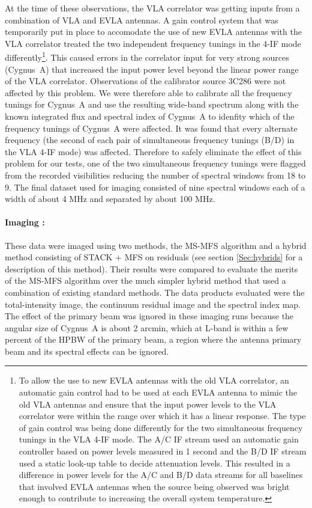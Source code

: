 \documentclass[structabstract]{stylefiles/aa}
\begin{document}
At the time of these observations, the VLA correlator was getting inputs from
a combination of VLA and EVLA antennas. A gain control system that was temporarily
put in place to accomodate the use of new EVLA antennas with the VLA correlator
treated the two independent frequency tunings
in the 4-IF mode differently\footnote
{
To allow the use to new EVLA antennas with
the old VLA correlator, an automatic gain control had to be used at each EVLA antenna
to mimic the old VLA antennas and ensure that the input power levels to the VLA correlator 
were within the range over which it has a linear response. The type of gain control 
was being done differently for the two simultaneous
frequency tunings in the VLA 4-IF mode. The A/C IF stream used an automatic
gain controller based on power levels measured in 1 second and the B/D IF stream
used a static look-up table to decide attenuation levels.
This resulted in a difference in power levels
for the A/C and B/D data streams for all baselines that involved EVLA antennas
when the source being observed was bright enough to contribute to increasing the
overall system temperature.
}. This caused errors in the correlator input for very strong sources (Cygnus~A)
that increased the input power level beyond the linear power range of the VLA correlator.
Observations of the calibrator source 3C286 were not affected by this problem.
We were therefore able to calibrate all the frequency tunings for Cygnus~A and use 
the resulting wide-band spectrum along with the known integrated flux and spectral index of
Cygnus~A to idenfity which of the frequency tunings of Cygnus~A 
were affected. It was found that every alternate frequency (the second of each pair 
of simultaneous frequency tunings (B/D) in the VLA 4-IF mode) was affected.
Therefore to safely eliminate the effect of this problem for our tests, 
one of the two simultaneous frequency tunings were flagged from the recorded 
visibilities reducing the number of spectral windows from 18 to 9.
The final dataset used for imaging consisted of nine spectral windows
each of a width of about 4 MHz and separated by about 100 MHz.

\paragraph{Imaging : }
These data were imaged using two methods, the  
MS-MFS algorithm and a hybrid method consisting of STACK + MFS on residuals
(see section \ref{Sec:hybrids} for a description of this method).
Their results were compared
to evaluate the merits of the MS-MFS algorithm over the much simpler hybrid
method that used a combination of existing standard methods.
The data products evaluated were the total-intensity image, the continuum residual image
and the spectral index map.
The effect of the primary beam was ignored in these imaging runs because 
the angular size of Cygnus~A is about 2 arcmin, which at L-band is within
a few percent of the HPBW of the primary beam, 
a region where the antenna primary beam and its spectral effects can be ignored.
\end{document}
